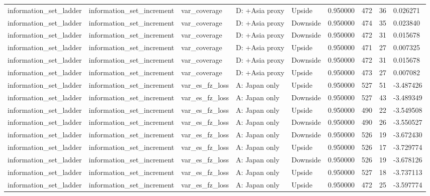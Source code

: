 \begin{tabular}{lllllrrr}
information\_set\_ladder & information\_set\_increment & var\_coverage & D: +Asia proxy & Upside & 0.950000 & 472 & 36 & 0.026271 \\
information\_set\_ladder & information\_set\_increment & var\_coverage & D: +Asia proxy & Downside & 0.950000 & 474 & 35 & 0.023840 \\
information\_set\_ladder & information\_set\_increment & var\_coverage & D: +Asia proxy & Downside & 0.950000 & 472 & 31 & 0.015678 \\
information\_set\_ladder & information\_set\_increment & var\_coverage & D: +Asia proxy & Upside & 0.950000 & 471 & 27 & 0.007325 \\
information\_set\_ladder & information\_set\_increment & var\_coverage & D: +Asia proxy & Downside & 0.950000 & 472 & 31 & 0.015678 \\
information\_set\_ladder & information\_set\_increment & var\_coverage & D: +Asia proxy & Upside & 0.950000 & 473 & 27 & 0.007082 \\
information\_set\_ladder & information\_set\_increment & var\_es\_fz\_loss & A: Japan only & Upside & 0.950000 & 527 & 51 & -3.487426 \\
information\_set\_ladder & information\_set\_increment & var\_es\_fz\_loss & A: Japan only & Downside & 0.950000 & 527 & 43 & -3.489349 \\
information\_set\_ladder & information\_set\_increment & var\_es\_fz\_loss & A: Japan only & Upside & 0.950000 & 490 & 22 & -3.549508 \\
information\_set\_ladder & information\_set\_increment & var\_es\_fz\_loss & A: Japan only & Downside & 0.950000 & 490 & 26 & -3.550527 \\
information\_set\_ladder & information\_set\_increment & var\_es\_fz\_loss & A: Japan only & Downside & 0.950000 & 526 & 19 & -3.672430 \\
information\_set\_ladder & information\_set\_increment & var\_es\_fz\_loss & A: Japan only & Upside & 0.950000 & 526 & 17 & -3.729774 \\
information\_set\_ladder & information\_set\_increment & var\_es\_fz\_loss & A: Japan only & Downside & 0.950000 & 526 & 19 & -3.678126 \\
information\_set\_ladder & information\_set\_increment & var\_es\_fz\_loss & A: Japan only & Upside & 0.950000 & 527 & 18 & -3.737113 \\
information\_set\_ladder & information\_set\_increment & var\_es\_fz\_loss & A: Japan only & Upside & 0.950000 & 472 & 25 & -3.597774 \\

\end{tabular}
